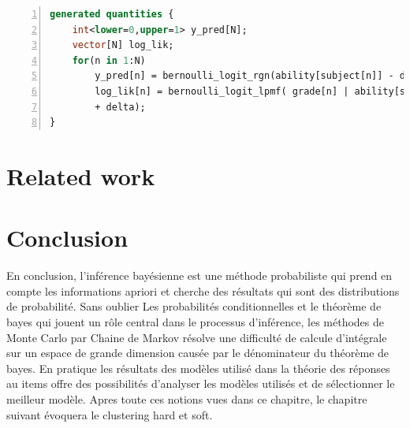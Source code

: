 \begin{lstlisting}[language=Stan,label={generated_quantities},basicstyle=\scriptsize, frame=l,framesep=4.5mm,framexleftmargin=2.5mm,tabsize=2,numbers=left,fillcolor=\color{blueforest!70},rulecolor=\color{blueforest},numberstyle=\normalfont\tiny\color{white}]
generated quantities {
	int<lower=0,upper=1> y_pred[N];
	vector[N] log_lik;
	for(n in 1:N)
		y_pred[n] = bernoulli_logit_rgn(ability[subject[n]] - difficulty[item[n]] + delta);
		log_lik[n] = bernoulli_logit_lpmf( grade[n] | ability[subject[n]] - difficulty[item[n]]
		+ delta);
}
\end{lstlisting}

\section{Related work}
\section{Conclusion}
En conclusion, l’inférence bayésienne est une méthode probabiliste qui prend en compte les informations apriori et cherche des résultats qui sont des distributions de probabilité. Sans oublier Les probabilités conditionnelles et le théorème de bayes qui jouent un rôle central dans le processus d’inférence, les méthodes de Monte Carlo par Chaine de Markov résolve une difficulté de calcule d’intégrale sur un espace de grande dimension causée par le dénominateur du théorème de bayes. En pratique les résultats des modèles utilisé dans la théorie des réponses au items offre des possibilités d’analyser les modèles utilisés et de sélectionner le meilleur modèle. Apres toute ces notions vues dans ce chapitre, le chapitre suivant évoquera le clustering hard et soft.

